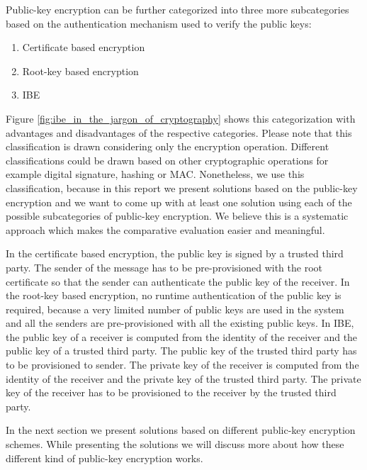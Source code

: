 \documentclass[lnicst,sechang,a4paper]{svmultln}
\begin{document}
Public-key encryption can be further categorized into three more subcategories based on the authentication mechanism used to verify the public keys:
\begin{enumerate}
\item Certificate based encryption
\item Root-key based encryption
\item IBE
\end{enumerate} 
Figure \ref{fig:ibe_in_the_jargon_of_cryptography} shows this categorization with advantages and disadvantages of the respective categories. Please note that this classification is drawn considering only the encryption operation. Different classifications could be drawn based on other cryptographic operations for example digital signature, hashing or MAC. Nonetheless, we use this classification, because in this report we present solutions based on the public-key encryption and we want to come up with at least one solution using each of the possible subcategories of public-key encryption. We believe this is a systematic approach which makes the comparative evaluation easier and meaningful. 

In the certificate based encryption, the public key is signed by a trusted third party. The sender of the message has to be pre-provisioned with the root certificate so that the sender can authenticate the public key of the receiver. In the root-key based encryption, no runtime authentication of the public key is required, because a very limited number of public keys are used in the system and all the senders are pre-provisioned with all the existing public keys. In IBE, the public key of a receiver is computed from the identity of the receiver and the public key of a trusted third party. The public key of the trusted third party has to be provisioned to sender. The private key of the receiver is computed from the identity of the receiver and the private key of the trusted third party. The private key of the receiver has to be provisioned to the receiver by the trusted third party.

In the next section we present solutions based on different public-key encryption schemes. While presenting the solutions we will discuss more about how these different kind of public-key encryption works.
\end{document}
